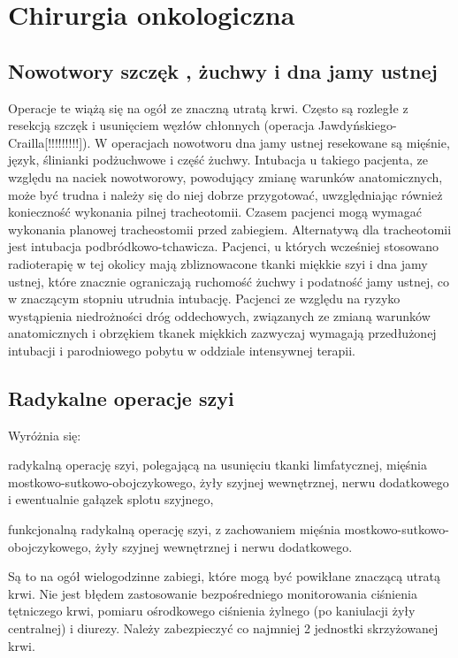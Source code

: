 \documentclass[a4paper, 12pt]{report}
\begin{document}
\section{Chirurgia onkologiczna}

\subsection{Nowotwory szczęk , żuchwy i dna jamy ustnej}

Operacje te wiążą się na ogół ze znaczną utratą krwi. Często są
rozległe z resekcją szczęk i usunięciem węzłów chłonnych (operacja
Jawdyńskiego-Crailla[!!!!!!!!!]). W operacjach nowotworu dna jamy
ustnej resekowane są mięśnie, język, ślinianki podżuchwowe i część
żuchwy. Intubacja u takiego pacjenta, ze względu na naciek
nowotworowy, powodujący zmianę warunków anatomicznych, może być trudna
i należy się do niej dobrze przygotować, uwzględniając również
konieczność wykonania pilnej tracheotomii. Czasem pacjenci mogą
wymagać wykonania planowej tracheostomii przed zabiegiem. Alternatywą
dla tracheotomii jest intubacja podbródkowo-tchawicza. Pacjenci, u
których wcześniej stosowano radioterapię w tej okolicy mają
zbliznowacone tkanki miękkie szyi i dna jamy ustnej, które znacznie
ograniczają ruchomość żuchwy i podatność jamy ustnej, co w znaczącym
stopniu utrudnia intubację.  Pacjenci ze względu na ryzyko wystąpienia
niedrożności dróg oddechowych, związanych ze zmianą warunków
anatomicznych i obrzękiem tkanek miękkich zazwyczaj wymagają
przedłużonej intubacji i parodniowego pobytu w oddziale intensywnej
terapii.

\subsection{Radykalne operacje szyi}

Wyróżnia się: 
\begin{inparaenum}
\item radykalną operację szyi, polegającą na usunięciu tkanki
limfatycznej, mięśnia mostkowo-sutkowo-obojczykowego, żyły szyjnej
wewnętrznej, nerwu dodatkowego i ewentualnie gałązek splotu szyjnego,
\item funkcjonalną radykalną operację szyi, z zachowaniem mięśnia
mostkowo-sutkowo-obojczykowego, żyły szyjnej wewnętrznej i nerwu
dodatkowego.
\end{inparaenum}

Są to na ogół wielogodzinne zabiegi, które mogą być powikłane znaczącą
utratą krwi. Nie jest błędem zastosowanie bezpośredniego monitorowania
ciśnienia tętniczego krwi, pomiaru ośrodkowego ciśnienia żylnego (po
kaniulacji żyły centralnej) i diurezy. Należy zabezpieczyć co najmniej
2 jednostki skrzyżowanej krwi. 
\end{document}
